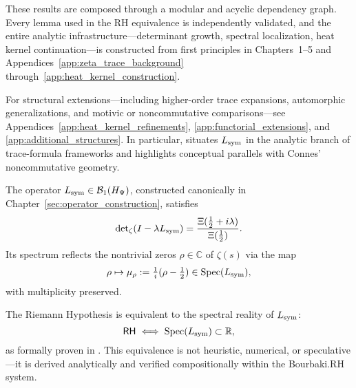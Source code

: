 \medskip

\noindent
These results are composed through a modular and acyclic dependency graph. Every lemma used in the RH equivalence is independently validated, and the entire analytic infrastructure—determinant growth, spectral localization, heat kernel continuation—is constructed from first principles in Chapters~1–5 and Appendices~\ref{app:zeta_trace_background} through~\ref{app:heat_kernel_construction}.

\medskip

\noindent
For structural extensions—including higher-order trace expansions, automorphic generalizations, and motivic or noncommutative comparisons—see Appendices~\ref{app:heat_kernel_refinements}, \ref{app:functorial_extensions}, and \ref{app:additional_structures}. In particular,  situates \( L_{\mathrm{sym}} \) in the analytic branch of trace-formula frameworks and highlights conceptual parallels with Connes’ noncommutative geometry.

\begin{tcolorbox}[colback=gray!2!white, colframe=black!50, title={\textbf{Canonical Equivalence — RH via Spectral Reality}}]
The operator \( L_{\mathrm{sym}} \in \mathcal{B}_1(H_{\Psi}) \), constructed canonically in Chapter~\ref{sec:operator_construction}, satisfies
\[
\det\nolimits_{\zeta}(I - \lambda L_{\mathrm{sym}}) = \frac{\Xi(\tfrac{1}{2} + i\lambda)}{\Xi(\tfrac{1}{2})}.
\]
Its spectrum reflects the nontrivial zeros \( \rho \in \mathbb{C} \) of \( \zeta(s) \) via the map
\[
\rho \mapsto \mu_\rho := \tfrac{1}{i}(\rho - \tfrac{1}{2}) \in \operatorname{Spec}(L_{\mathrm{sym}}),
\]
with multiplicity preserved.

\medskip

\noindent The Riemann Hypothesis is equivalent to the spectral reality of \( L_{\mathrm{sym}} \):
\[
\mathsf{RH} \iff \operatorname{Spec}(L_{\mathrm{sym}}) \subset \mathbb{R},
\]
as formally proven in . This equivalence is not heuristic, numerical, or speculative—it is derived analytically and verified compositionally within the Bourbaki.RH system.
\end{tcolorbox}
